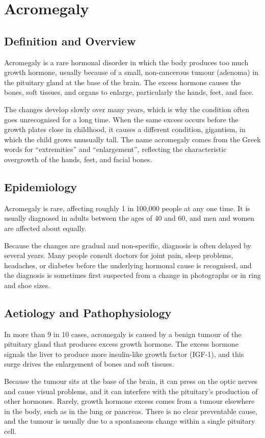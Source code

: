 \chapter{Acromegaly}

\section*{Definition and Overview}
Acromegaly is a rare hormonal disorder in which the body produces too much growth hormone, usually because of a small, non-cancerous tumour (adenoma) in the pituitary gland at the base of the brain. The excess hormone causes the bones, soft tissues, and organs to enlarge, particularly the hands, feet, and face.

The changes develop slowly over many years, which is why the condition often goes unrecognised for a long time. When the same excess occurs before the growth plates close in childhood, it causes a different condition, gigantism, in which the child grows unusually tall. The name acromegaly comes from the Greek words for ``extremities'' and ``enlargement'', reflecting the characteristic overgrowth of the hands, feet, and facial bones.

\section*{Epidemiology}
Acromegaly is rare, affecting roughly 1 in 100,000 people at any one time. It is usually diagnosed in adults between the ages of 40 and 60, and men and women are affected about equally.

Because the changes are gradual and non-specific, diagnosis is often delayed by several years. Many people consult doctors for joint pain, sleep problems, headaches, or diabetes before the underlying hormonal cause is recognised, and the diagnosis is sometimes first suspected from a change in photographs or in ring and shoe sizes.

\section*{Aetiology and Pathophysiology}
In more than 9 in 10 cases, acromegaly is caused by a benign tumour of the pituitary gland that produces excess growth hormone. The excess hormone signals the liver to produce more insulin-like growth factor (IGF-1), and this surge drives the enlargement of bones and soft tissues.

Because the tumour sits at the base of the brain, it can press on the optic nerves and cause visual problems, and it can interfere with the pituitary's production of other hormones. Rarely, growth hormone excess comes from a tumour elsewhere in the body, such as in the lung or pancreas. There is no clear preventable cause, and the tumour is usually due to a spontaneous change within a single pituitary cell.

